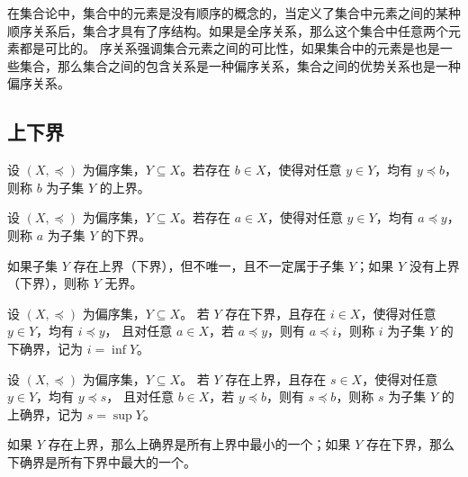 \begin{note}
    在集合论中，集合中的元素是没有顺序的概念的，当定义了集合中元素之间的某种顺序关系后，集合才具有了序结构。如果是全序关系，那么这个集合中任意两个元素都是可比的。
    序关系强调集合元素之间的可比性，如果集合中的元素是也是一些集合，那么集合之间的包含关系是一种偏序关系，集合之间的优势关系也是一种偏序关系。
\end{note}
\vspace{1em}

\subsection{上下界}

\begin{definition}
    设 $ (X,\preceq) $ 为偏序集，$ Y\subseteq X $。若存在 $ b\in X $，使得对任意 $ y\in Y $，均有 $ y\preceq b $，则称 $ b $ 为子集 $ Y $ 的上界。
\end{definition}

\begin{definition}
    设 $ (X,\preceq) $ 为偏序集，$ Y\subseteq X $。若存在 $ a\in X $，使得对任意 $ y\in Y $，均有 $ a\preceq y $，则称 $ a $ 为子集 $ Y $ 的下界。
\end{definition}

\begin{note}
    如果子集 $Y$ 存在上界（下界），但不唯一，且不一定属于子集 $ Y $；如果 $ Y $  没有上界（下界），则称 $ Y $ 无界。
\end{note}
\vspace{1em}

\begin{definition}
    设 $ (X,\preceq) $ 为偏序集，$ Y\subseteq X $。
    若 $ Y $ 存在下界，且存在 $ i\in X $，使得对任意 $ y\in Y $，均有 $ i\preceq y $，
    且对任意 $ a\in X $，若 $ a\preceq y $，则有 $ a\preceq i $，则称 $ i $ 为子集 $ Y $ 的下确界，记为 $ i=\inf Y $。
\end{definition}

\begin{definition}
    设 $ (X,\preceq) $ 为偏序集，$ Y\subseteq X $。
    若 $ Y $ 存在上界，且存在 $ s\in X $，使得对任意 $ y\in Y $，均有 $ y\preceq s $，
    且对任意 $ b\in X $，若 $ y\preceq b $，则有 $ s\preceq b $，则称 $ s $ 为子集 $ Y $ 的上确界，记为 $ s=\sup Y $。
\end{definition}

\begin{note}
    如果 $Y$ 存在上界，那么上确界是所有上界中最小的一个；如果 $Y$ 存在下界，那么下确界是所有下界中最大的一个。
\end{note}

